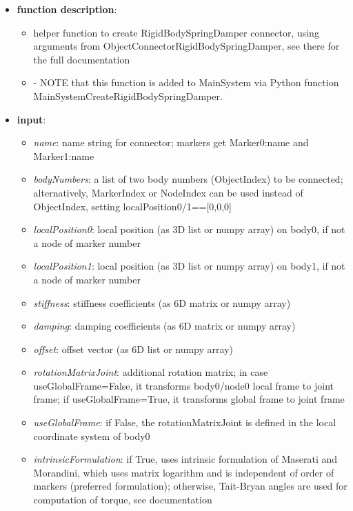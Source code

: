 \begin{itemize}[leftmargin=0.7cm]
\item[--]
{\bf function description}: \vspace{-6pt}
\begin{itemize}[leftmargin=1.2cm]
\setlength{\itemindent}{-0.7cm}
\item[]helper function to create RigidBodySpringDamper connector, using arguments from ObjectConnectorRigidBodySpringDamper, see there for the full documentation
\item[]- NOTE that this function is added to MainSystem via Python function MainSystemCreateRigidBodySpringDamper.
\end{itemize}
\item[--]
{\bf input}: \vspace{-6pt}
\begin{itemize}[leftmargin=1.2cm]
\setlength{\itemindent}{-0.7cm}
\item[]{\it name}: name string for connector; markers get Marker0:name and Marker1:name
\item[]{\it bodyNumbers}: a list of two body numbers (ObjectIndex) to be connected; alternatively, MarkerIndex or NodeIndex can be used instead of ObjectIndex, setting localPosition0/1==[0,0,0]
\item[]{\it localPosition0}: local position (as 3D list or numpy array) on body0, if not a node of marker number
\item[]{\it localPosition1}: local position (as 3D list or numpy array) on body1, if not a node of marker number
\item[]{\it stiffness}: stiffness coefficients (as 6D matrix or numpy array)
\item[]{\it damping}: damping coefficients (as 6D matrix or numpy array)
\item[]{\it offset}: offset vector (as 6D list or numpy array)
\item[]{\it rotationMatrixJoint}: additional rotation matrix; in case  useGlobalFrame=False, it transforms body0/node0 local frame to joint frame; if useGlobalFrame=True, it transforms global frame to joint frame
\item[]{\it useGlobalFrame}: if False, the rotationMatrixJoint is defined in the local coordinate system of body0
\item[]{\it intrinsicFormulation}: if True, uses intrinsic formulation of Maserati and Morandini, which uses matrix logarithm and is independent of order of markers (preferred formulation); otherwise, Tait-Bryan angles are used for computation of torque, see documentation

\end{itemize}
\end{itemize}
